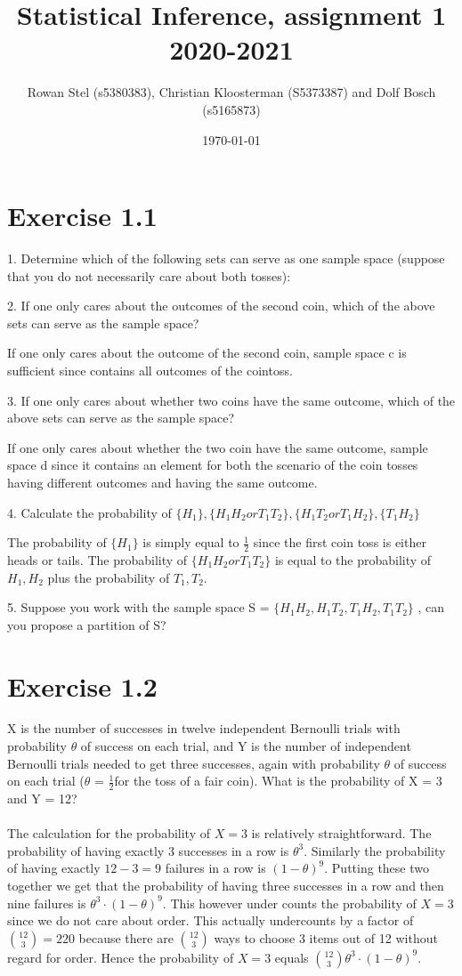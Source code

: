 \documentclass[a4paper,11pt]{article}
\author{Rowan Stel (s5380383), Christian Kloosterman (S5373387) and Dolf Bosch (s5165873)}
\date{\today}
\title{Statistical Inference, assignment 1\\
  2020-2021
  }
\newcommand{\1}[1]{\,I_{#1}} %
\begin{document}
\maketitle

\section{Exercise 1.1}

1. Determine which of the following sets can serve as one sample space (suppose that you do not necessarily care about both tosses):

2. If one only cares about the outcomes of the second coin, which of the above sets can serve as the sample space?

If one only cares about the outcome of the second coin, sample space c is sufficient since contains all outcomes of the cointoss. 

3. If one only cares about whether two coins have the same outcome, which of the above sets can serve as the sample space?

If one only cares about whether the two coin have the same outcome, sample space d since it contains an element for both the scenario of the coin tosses having different outcomes and having the same outcome. %

4. Calculate the probability of  $\{H_1\}, \{H_1 H_2 or T_1T_2\}, \{H_1T_2 or T_1 H_2\}, \{T_1 H_2\}$

The probability of  $\{H_1\}$ is simply equal to $\frac{1}{2}$ since the first coin toss is either heads or tails. The probability of $\{H_1 H_2 or T_1T_2\}$ is equal to the probability of $H_1, H_2$ plus the probability of $T_1, T_2$.


5. Suppose you work with the sample space S = $\{H_1 H_2, H_1T_2, T_1 H_2, T_1T_2\}$ , can you propose a partition of S?


\section{Exercise 1.2}
X is the number of successes in twelve independent Bernoulli trials with probability $\theta$ of success on each trial, and Y is the number of independent Bernoulli trials needed to get three successes, again with probability $\theta$ of success on each trial ($\theta$ = $\frac{1}{2} $for the toss of a fair coin). What is the probability of X = 3 and Y = 12?
\\ \\
The calculation for the probability of $X=3$ is relatively straightforward. The probability of having exactly 3 successes in a row is $\theta^3$. Similarly the probability of having exactly $12-3 = 9$ failures in a row is $(1-\theta)^9$. Putting these two together we get that the probability of having three successes in a row and then nine failures is $\theta^3 \cdot(1-\theta)^9$. This however under counts the probability of $X=3$ since we do not care about order. This actually undercounts by a factor of $\binom{12}{3} = 220$ because there are $\binom{12}{3}$ ways to choose 3 items out of 12 without regard for order. Hence the probability of $X = 3$ equals $\binom{12}{3}\theta^3 \cdot (1 - \theta)^9$.
\end{document}
